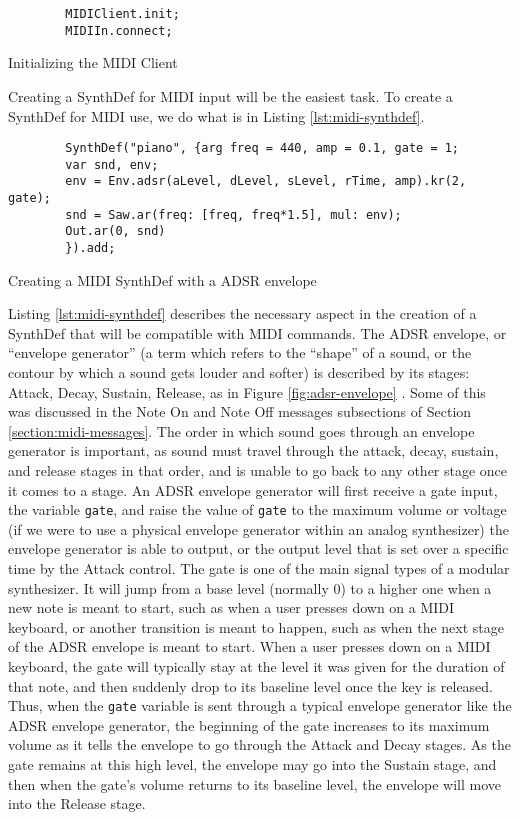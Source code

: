 \begin{listing}
	\begin{lstlisting}
		MIDIClient.init;
		MIDIIn.connect;
	\end{lstlisting}
	\caption{Initializing the MIDI Client}
	\label{lst:initialize-midi}
\end{listing}

Creating a SynthDef for MIDI input will be the easiest task. To create a SynthDef for MIDI use, we do what is in Listing \ref{lst:midi-synthdef}. 

\begin{listing}
	\begin{lstlisting}
		SynthDef("piano", {arg freq = 440, amp = 0.1, gate = 1;
		var snd, env;
		env = Env.adsr(aLevel, dLevel, sLevel, rTime, amp).kr(2, gate);
		snd = Saw.ar(freq: [freq, freq*1.5], mul: env);
		Out.ar(0, snd)
		}).add;
	\end{lstlisting}
	\caption{Creating a MIDI SynthDef with a ADSR envelope}
	\label{lst:midi-synthdef}	
\end{listing}

Listing \ref{lst:midi-synthdef} describes the necessary aspect in the creation of a SynthDef that will  be compatible with MIDI commands. The ADSR envelope, or ``envelope generator'' (a term which refers to the ``shape'' of a sound, or the contour by which a sound gets louder and softer) is described by its stages: Attack, Decay, Sustain, Release, as in Figure \ref{fig:adsr-envelope} \cite{Puckette_2007}. Some of this was discussed in the Note On and Note Off messages subsections of Section \ref{section:midi-messages}. The order in which sound goes through an envelope generator is important, as sound must travel through the attack, decay, sustain, and release stages in that order, and is unable to go back to any other stage once it comes to a stage. An ADSR envelope generator will first receive a gate input, the variable \texttt{gate}, and raise the value of \texttt{gate} to the maximum volume or voltage (if we were to use a physical envelope generator within an analog synthesizer) the envelope generator is able to output, or the output level that is set over a specific time by the Attack control. The gate is one of the main signal types of a modular synthesizer. It will jump from a base level (normally 0) to a higher one when a new note is meant to start, such as when a user presses down on a MIDI keyboard, or another transition is meant to happen, such as when the next stage of the ADSR envelope is meant to start. When a user presses down on a MIDI keyboard, the gate will typically stay at the level it was given for the duration of that note, and then suddenly drop to its baseline level once the key is released. Thus, when the \texttt{gate} variable is sent through a typical envelope generator like the ADSR envelope generator, the beginning of the gate increases to its maximum volume as it tells the envelope to go through the Attack and Decay stages. As the gate remains at this high level, the envelope may go into the Sustain stage, and then when the gate's volume returns to its baseline level, the envelope will move into the Release stage. 

